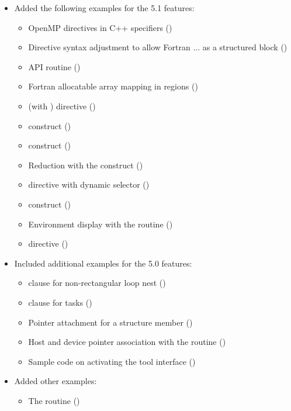 \begin{itemize}
\item Added the following examples for the 5.1 features:
\begin{itemize}
  \item OpenMP directives in C++  specifiers
    ()
  \item Directive syntax adjustment to allow Fortran  ... 
     as a structured block 
      ()
  \item {} API routine
      ()
  \item Fortran allocatable array mapping in  regions ()
  \item {} (with
        ) directive
      ()
  \item {} construct             ()
  \item {} construct           ()
  \item Reduction with the  construct
      ()
  \item  {} directive with dynamic  selector
      ()
  \item {} construct  ()
  \item Environment display with the  routine
      ()
  \item {} directive  ()
\end{itemize}

\item Included additional examples for the 5.0 features:
\begin{itemize}
  \item {} clause for non-rectangular loop nest
      ()
  \item {} clause for tasks ()
  \item Pointer attachment for a structure member ()
  \item Host and device pointer association with the  routine ()
  
  \item Sample code on activating the tool interface 
      ()
\end{itemize}

\item Added other examples:
\begin{itemize}
  \item The  routine ()
\end{itemize}
\end{itemize}


